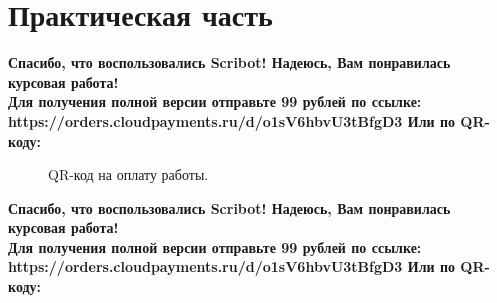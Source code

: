 \documentclass{article}
\begin{document}
\newpage

\section{Практическая часть}
\begin{center}
    \textbf{
        Спасибо, что воспользовались Scribot! Надеюсь, Вам понравилась курсовая работа!\\
        Для получения полной версии отправьте 99 рублей по ссылке:\\
        https://orders.cloudpayments.ru/d/o1sV6hbvU3tBfgD3
        Или по QR-коду:\\
    }
\end{center}
\begin{figure}[h]
    \caption{QR-код на оплату работы.}
    \label{ris:image}
\end{figure}
\newpage
\begin{center}
    \textbf{
        Спасибо, что воспользовались Scribot! Надеюсь, Вам понравилась курсовая работа!\\
        Для получения полной версии отправьте 99 рублей по ссылке:\\
        https://orders.cloudpayments.ru/d/o1sV6hbvU3tBfgD3
        Или по QR-коду:\\
    }
\end{center}
\end{document}
